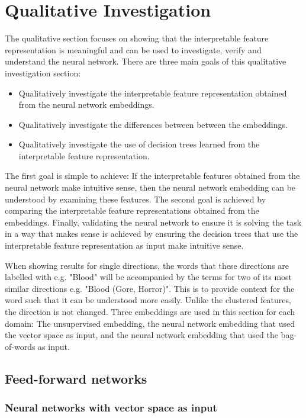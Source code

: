 \section{Qualitative Investigation}\label{ch5:qual}

The qualitative section  focuses on showing that the interpretable feature representation is meaningful and can be used to investigate, verify and understand the neural network. There are three main goals of this qualitative investigation section:

\begin{itemize}
	\item Qualitatively investigate the interpretable feature representation obtained from the neural network embeddings.
	\item Qualitatively investigate the differences between between the embeddings.
	\item Qualitatively investigate the use of decision trees learned from the interpretable feature representation.
\end{itemize}

The first goal is simple to achieve: If the interpretable features obtained from the neural network make intuitive sense, then the neural network embedding can be understood by examining these features. The second goal is achieved by comparing the interpretable feature representations obtained from the embeddings. Finally, validating the neural network to ensure it is solving the task in a way that makes sense is achieved by ensuring the decision trees that use the interpretable feature representation as input make intuitive sense. 

When showing results for single directions, the words that these directions are labelled with e.g. "Blood" will be accompanied by the terms for two of its most similar directions e.g. "Blood (Gore, Horror)". This is to provide context for the word such that it can be understood more easily. Unlike the clustered features, the direction is not changed. Three embeddings are used in this section for each domain: The unsupervised embedding, the neural network embedding that used the vector space as input, and the neural network embedding that used the bag-of-words as input. 

\subsection{Feed-forward networks}

\subsubsection{Neural networks with vector space as input}

